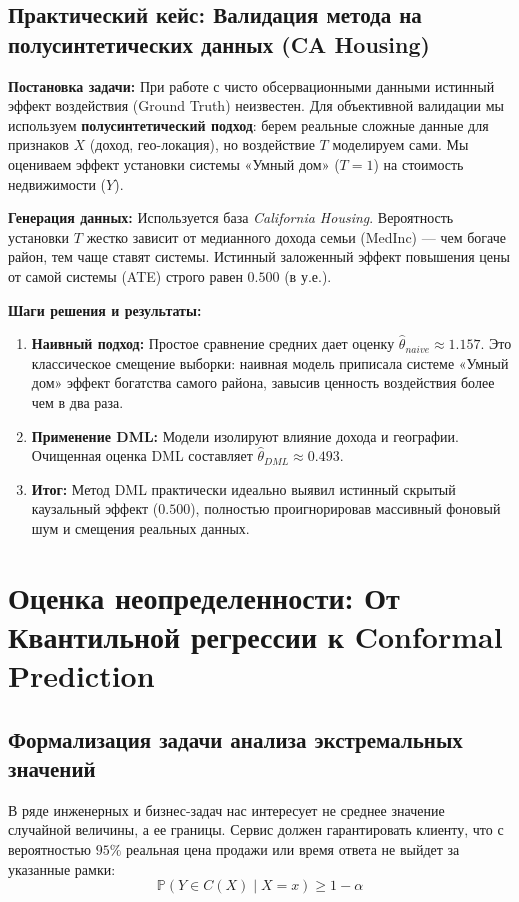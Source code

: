 \documentclass[12pt, a4paper]{article}
\begin{document}
\subsection{Практический кейс: Валидация метода на полусинтетических данных (CA Housing)}
\textbf{Постановка задачи:} При работе с чисто обсервационными данными истинный эффект воздействия (Ground Truth) неизвестен. Для объективной валидации мы используем \textbf{полусинтетический подход}: берем реальные сложные данные для признаков $X$ (доход, гео-локация), но воздействие $T$ моделируем сами. Мы оцениваем эффект установки системы «Умный дом» ($T=1$) на стоимость недвижимости ($Y$).

\textbf{Генерация данных:} 
Используется база \textit{California Housing}. Вероятность установки $T$ жестко зависит от медианного дохода семьи (MedInc) — чем богаче район, тем чаще ставят системы. Истинный заложенный эффект повышения цены от самой системы (ATE) строго равен $0.500$ (в у.е.).

\textbf{Шаги решения и результаты:}
\begin{enumerate}
    \item \textbf{Наивный подход:} Простое сравнение средних дает оценку $\hat{\theta}_{naive} \approx 1.157$. Это классическое смещение выборки: наивная модель приписала системе «Умный дом» эффект богатства самого района, завысив ценность воздействия более чем в два раза.
    \item \textbf{Применение DML:} Модели изолируют влияние дохода и географии. Очищенная оценка DML составляет $\hat{\theta}_{DML} \approx 0.493$.
    \item \textbf{Итог:} Метод DML практически идеально выявил истинный скрытый каузальный эффект ($0.500$), полностью проигнорировав массивный фоновый шум и смещения реальных данных.
\end{enumerate}

\newpage
\section{Оценка неопределенности: От Квантильной регрессии к Conformal Prediction}

\subsection{Формализация задачи анализа экстремальных значений}
В ряде инженерных и бизнес-задач нас интересует не среднее значение случайной величины, а ее границы. Сервис должен гарантировать клиенту, что с вероятностью $95\%$ реальная цена продажи или время ответа не выйдет за указанные рамки:
$$\mathbb{P}(Y \in C(X) \mid X = x) \ge 1 - \alpha$$
\end{document}
